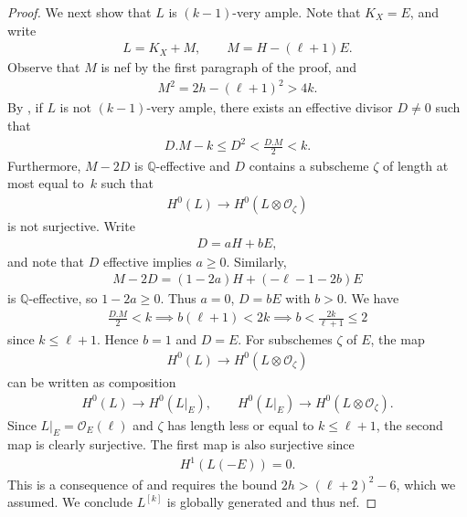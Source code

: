 \documentclass[10pt,a4paper]{amsart}
\numberwithin{equation}{section}
\begin{document}
\begin{proof}
We next show that $L$ is $(k-1)$-very ample. Note that $K_X=E$, and write
\begin{gather*}
L=K_X+M, \qquad M=H-(\ell+1)E.
\end{gather*}
Observe that $M$ is nef by the first paragraph of the proof, and
\begin{gather*}
M^2=2h-(\ell+1)^2>4k.
\end{gather*}
By \cite[Theorem 2.1]{BS}, if $L$ is not $(k-1)$-very ample, there exists an effective divisor $D\neq 0$ such that
\begin{gather*}
D.M-k\leq D^2<\frac{D.M}{2}<k.
\end{gather*}
Furthermore, $M-2D$ is $\mathbb Q$-effective and $D$ contains a subscheme $\zeta$ of length at most
equal to~$k$ such that
\begin{gather*}
H^0(L)\to H^0(L\otimes \mathcal O_\zeta)
\end{gather*}
is not surjective. Write \begin{gather*}D=aH+bE,
\end{gather*}
and note that $D$ effective implies $a\geq 0$. Similarly,
\begin{gather*}
M-2D=(1-2a)H+(-\ell-1-2b)E
\end{gather*}
is $\mathbb Q$-effective, so $1-2a\geq 0$. Thus $a=0$, $D=bE$ with $b > 0$. We have
\begin{gather*}
\frac{D.M}{2}<k\implies b(\ell+1)<2k\implies b<\frac{2k}{\ell+1}\leq 2
\end{gather*}
since $k\leq \ell+1$. Hence $b=1$ and $D=E$. For subschemes $\zeta$ of $E$, the map
\begin{gather*}
H^0(L)\to H^0(L\otimes \mathcal O_\zeta)
\end{gather*}
can be written as composition
\begin{gather*}
H^0(L)\to H^0(L|_{E}), \qquad H^0(L|_E)\to H^0(L\otimes \mathcal O_{\zeta}).
\end{gather*}
Since $L|_{E}=\mathcal O_E(\ell)$ and $\zeta$ has length less or equal to $k\leq \ell+1$, the second map is clearly surjective. The first map is also surjective since
\begin{gather*}
H^1(L(-E))=0.
\end{gather*}
This is a consequence of \cite[Proposition 4.1]{V} and requires the bound $2h>(\ell+2)^2-6$, which we assumed. We conclude $L^{[k]}$ is globally generated and thus nef.


\end{proof}
\end{document}
